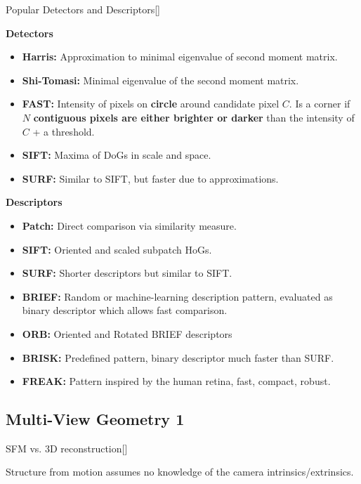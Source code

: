 \documentclass[10pt,a4paper]{scrartcl}
\begin{document}
\begin{multicols*}{2}
\begin{QandA}{Popular Detectors and Descriptors}[\Comparison]
\item \textbf{Detectors}
\begin{itemize}
\item \textbf{Harris:} Approximation to minimal eigenvalue of second moment matrix.
\item \textbf{Shi-Tomasi:} Minimal eigenvalue of the second moment matrix.
\item \textbf{FAST:} Intensity of pixels on \textbf{circle} around candidate pixel $C$. Is a corner if $N$ \textbf{contiguous pixels are either brighter or darker} than the intensity of $C$ + a threshold.
\item \textbf{SIFT:} Maxima of DoGs in scale and space.
\item \textbf{SURF:} Similar to SIFT, but faster due to approximations.
\end{itemize}
\item \textbf{Descriptors}
\begin{itemize}
\item \textbf{Patch:} Direct comparison via similarity measure.
\item \textbf{SIFT:} Oriented and scaled subpatch HoGs.
\item \textbf{SURF:} Shorter descriptors but similar to SIFT.
\item \textbf{BRIEF:} Random or machine-learning description pattern, evaluated as binary descriptor which allows fast comparison.
\item \textbf{ORB:} Oriented and Rotated BRIEF descriptors
\item \textbf{BRISK:} Predefined pattern, binary descriptor much faster than SURF.
\item \textbf{FREAK:} Pattern inspired by the human retina, fast, compact, robust.
\end{itemize}
\end{QandA}

\subsection*{Multi-View Geometry 1}

\begin{QandA}
{SFM vs. 3D reconstruction}[\Comparison]
\item Structure from motion assumes no knowledge of the camera intrinsics/extrinsics.
\end{QandA}
	

\end{multicols*}
\end{document}

